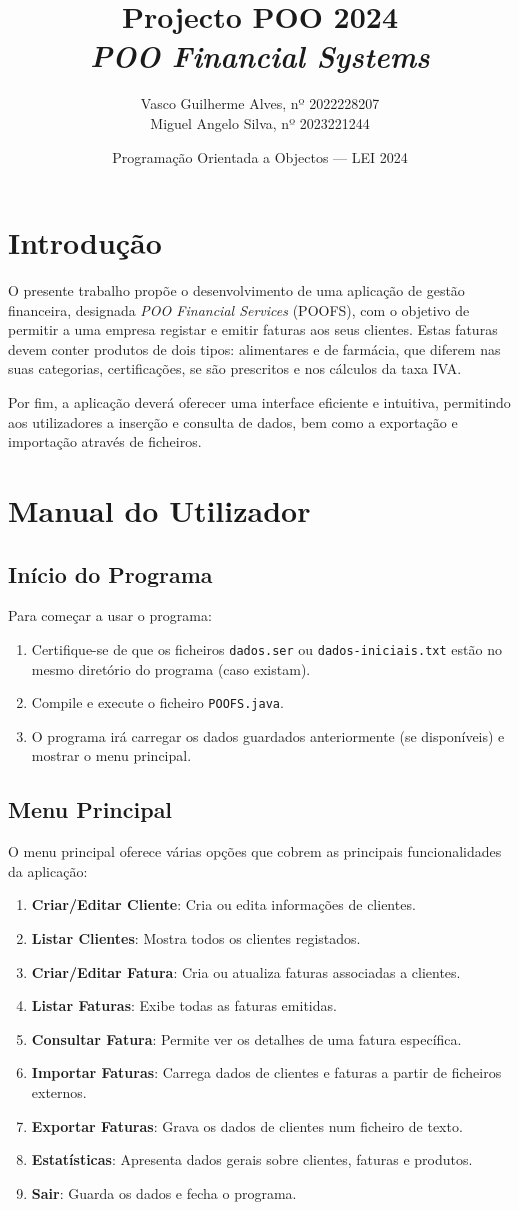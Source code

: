 \documentclass[a4paper, 11pt]{article}
\title{\Huge Projecto POO 2024\\
        \it \huge POO Financial Systems
}
\author{Vasco Guilherme Alves, nº 2022228207\\
Miguel Angelo Silva, nº 2023221244\\
}
\date{Programação Orientada a Objectos --- LEI 2024}
\newcommand\ssection[1]{\section{#1} }
\newcommand\sssection[1]{ \subsection*{\color{MidnightBlue}#1}\vspace{-2ex} }
\begin{document}
\maketitle
\tableofcontents

\newpage
\ssection{Introdução}

O presente trabalho propõe o desenvolvimento de uma aplicação de gestão financeira, designada \textit{POO Financial Services} (POOFS), com o objetivo de permitir a uma empresa registar e emitir faturas aos seus clientes. Estas faturas devem conter produtos de dois tipos: alimentares e de farmácia, que diferem nas suas categorias, certificações, se são prescritos e nos cálculos da taxa IVA.

Por fim, a aplicação deverá oferecer uma interface eficiente e intuitiva, permitindo aos utilizadores a inserção e consulta de dados, bem como a exportação e importação através de ficheiros.

\ssection{Manual do Utilizador}

\sssection{Início do Programa}
Para começar a usar o programa:
\begin{enumerate}
    \item Certifique-se de que os ficheiros \texttt{dados.ser} ou \texttt{dados-iniciais.txt} estão no mesmo diretório do programa (caso existam).
    \item Compile e execute o ficheiro \texttt{POOFS.java}.
    \item O programa irá carregar os dados guardados anteriormente (se disponíveis) e mostrar o menu principal.
\end{enumerate}

\sssection{Menu Principal}
O menu principal oferece várias opções que cobrem as principais funcionalidades da aplicação:
\begin{enumerate}
    \item \textbf{Criar/Editar Cliente}: Cria ou edita informações de clientes.
    \item \textbf{Listar Clientes}: Mostra todos os clientes registados.
    \item \textbf{Criar/Editar Fatura}: Cria ou atualiza faturas associadas a clientes.
    \item \textbf{Listar Faturas}: Exibe todas as faturas emitidas.
    \item \textbf{Consultar Fatura}: Permite ver os detalhes de uma fatura específica.
    \item \textbf{Importar Faturas}: Carrega dados de clientes e faturas a partir de ficheiros externos.
    \item \textbf{Exportar Faturas}: Grava os dados de clientes num ficheiro de texto.
    \item \textbf{Estatísticas}: Apresenta dados gerais sobre clientes, faturas e produtos.
    \item \textbf{Sair}: Guarda os dados e fecha o programa.
\end{enumerate}
\end{document}
